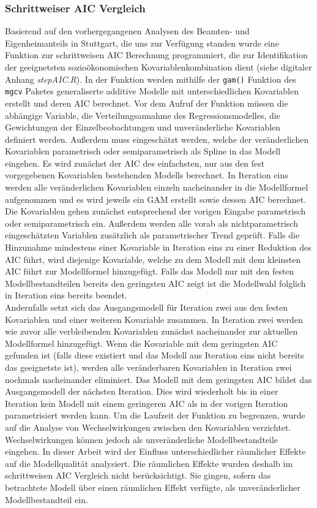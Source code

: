 \documentclass{Vorlage}
\begin{document}
\subsubsection{Schrittweiser AIC Vergleich}
Basierend auf den vorhergegangenen Analysen des Beamten- und Eigenheimanteils in Stuttgart, die uns zur Verfügung standen wurde eine Funktion zur schrittweisen AIC \cite{Akaike1981} Berechnung programmiert, die zur Identifikation der geeignetsten sozioökonomischen Kovariablenkombination dient (siehe digitaler Anhang \textit{stepAIC.R}). In der Funktion werden mithilfe der \texttt{gam()} Funktion des \texttt{mgcv} 
Paketes \cite{Wood2011} generaliserte additive Modelle mit unterschiedlichen Kovariablen erstellt und deren AIC 
berechnet. Vor dem Aufruf der Funktion müssen die abhängige Variable, die Verteilungsannahme des Regressionsmodelles, 
die Gewichtungen der Einzelbeobachtungen und unveränderliche Kovariablen definiert werden. Außerdem muss eingeschätzt 
werden, welche der veränderlichen Kovariablen parametrisch oder semiparametrisch als Spline in das Modell eingehen. Es 
wird zunächst der AIC des einfachsten, nur aus den fest vorgegebenen Kovariablen bestehenden Modells berechnet. In 
Iteration eins werden alle veränderlichen Kovariablen einzeln nacheinander in die Modellformel aufgenommen und es wird 
jeweils ein GAM erstellt sowie dessen AIC berechnet. Die Kovariablen gehen zunächst entsprechend der vorigen Eingabe parametrisch 
oder semiparametrisch ein. Außerdem werden alle vorab als nichtparametrisch eingeschätzten Variablen zusätzlich als parametrischer Trend geprüft. Falls die Hinzunahme mindestens einer Kovariable in Iteration eins zu einer Reduktion des AIC 
führt, wird diejenige Kovariable, welche zu dem Modell mit dem kleinsten AIC führt zur Modellformel hinzugefügt. Falls 
das Modell nur mit den festen Modellbestandteilen bereits den geringsten AIC zeigt ist die Modellwahl folglich in 
Iteration eins bereits beendet.\\ 
Andernfalls setzt sich das Ausgangsmodell für Iteration zwei aus den festen 
Kovariablen und einer weiteren Kovariable zusammen. In Iteration zwei werden wie zuvor alle verbleibenden Kovariablen 
zunächst nacheinander zur aktuellen Modellformel hinzugefügt. Wenn die Kovariable mit dem geringsten AIC gefunden ist 
(falls diese existiert und das Modell aus Iteration eins nicht bereits das geeignetste ist), werden alle veränderbaren 
Kovariablen in Iteration zwei nochmals nacheinander eliminiert. Das Modell mit dem geringsten AIC bildet das 
Ausgangsmodell der nächsten Iteration. Dies wird wiederholt bis in einer Iteration kein Modell mit einem geringeren AIC 
als in der vorigen Iteration parametrisiert werden kann. Um die Laufzeit der Funktion zu begrenzen, wurde auf die 
Analyse von Wechselwirkungen zwischen den Kovariablen verzichtet. Wechselwirkungen können jedoch als unveränderliche 
Modellbestandteile eingehen. In dieser Arbeit wird der Einfluss unterschiedlicher räumlicher Effekte auf die Modellqualität analysiert. Die räumlichen Effekte wurden deshalb im schrittweisen AIC Vergleich nicht berücksichtigt. Sie gingen, sofern das betrachtete Modell über einen räumlichen Effekt verfügte, als unveränderlicher Modellbestandteil ein.
\end{document}
